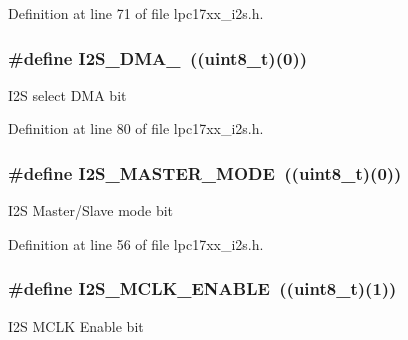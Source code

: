\-Definition at line 71 of file lpc17xx\-\_\-i2s.\-h.

\hypertarget{group___i2_s___public___macros_ga75aefb3a3233a2f0b37dbeb544d86403}{
\subsubsection[{\-I2\-S\-\_\-\-D\-M\-A\-\_\-1}]{\setlength{\rightskip}{0pt plus 5cm}\#define {\bf \-I2\-S\-\_\-\-D\-M\-A\-\_}~((uint8\-\_\-t)(0))}}\label{group___i2_s___public___macros_ga75aefb3a3233a2f0b37dbeb544d86403}
\-I2\-S select \-D\-M\-A bit 

\-Definition at line 80 of file lpc17xx\-\_\-i2s.\-h.

\hypertarget{group___i2_s___public___macros_ga67cd00ecbec35d0dd723909916fb1014}{
\subsubsection[{\-I2\-S\-\_\-\-M\-A\-S\-T\-E\-R\-\_\-\-M\-O\-D\-E}]{\setlength{\rightskip}{0pt plus 5cm}\#define {\bf \-I2\-S\-\_\-\-M\-A\-S\-T\-E\-R\-\_\-\-M\-O\-D\-E}~((uint8\-\_\-t)(0))}}\label{group___i2_s___public___macros_ga67cd00ecbec35d0dd723909916fb1014}
\-I2\-S \-Master/\-Slave mode bit 

\-Definition at line 56 of file lpc17xx\-\_\-i2s.\-h.

\hypertarget{group___i2_s___public___macros_ga1d6e7b12323fb3c8f341943afe596a43}{
\subsubsection[{\-I2\-S\-\_\-\-M\-C\-L\-K\-\_\-\-E\-N\-A\-B\-L\-E}]{\setlength{\rightskip}{0pt plus 5cm}\#define {\bf \-I2\-S\-\_\-\-M\-C\-L\-K\-\_\-\-E\-N\-A\-B\-L\-E}~((uint8\-\_\-t)(1))}}\label{group___i2_s___public___macros_ga1d6e7b12323fb3c8f341943afe596a43}
\-I2\-S \-M\-C\-L\-K \-Enable bit 

